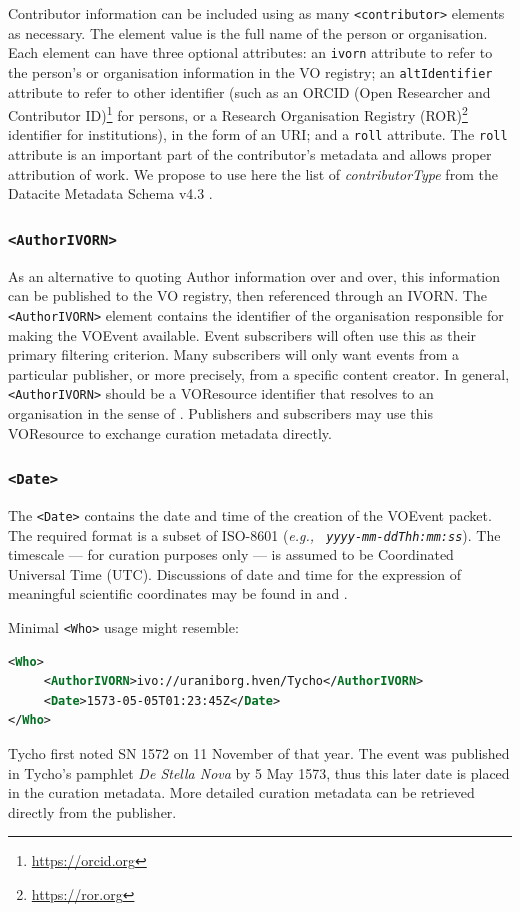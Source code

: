 \documentclass[11pt,a4paper]{ivoa}
\begin{document}
Contributor information can be included using as many {\tt <contributor>} 
elements as necessary. The element value is the full name of the person or 
organisation. Each element can have three optional attributes: an {\tt ivorn} 
attribute to refer to the person's or organisation information in the VO 
registry; an {\tt altIdentifier} attribute to refer to other identifier (such 
as an ORCID (Open Researcher and Contributor ID)\footnote{
\url{https://orcid.org}} for persons, or a Research Organisation Registry 
(ROR)\footnote{\url{https://ror.org}} identifier for institutions), in the form 
of an URI; and a {\tt roll} attribute. The {\tt roll} attribute is an important 
part of the contributor's metadata and allows proper attribution of work. We 
propose to use here the list of \emph{contributorType} from the Datacite 
Metadata Schema v4.3 \citep{https://doi.org/10.14454/7xq3-zf69}.

\subsubsection{\tt <AuthorIVORN>}
As an alternative to quoting Author information over and over, this information 
can be published to the VO registry, then referenced through an IVORN. The {\tt 
<AuthorIVORN>} element contains the identifier of the organisation responsible 
for making the VOEvent available. Event subscribers will often use this as their 
primary filtering criterion. Many subscribers will only want events from a 
particular publisher, or more precisely, from a specific content creator. In 
general, {\tt <AuthorIVORN>} should be a VOResource identifier that resolves to 
an organisation in the sense of \citep{2007ivoa.spec.0302H}. Publishers and 
subscribers may use this VOResource to exchange curation metadata directly. 

\subsubsection{\tt <Date>}
The {\tt <Date>} contains the date and time of the creation of the VOEvent 
packet. The required format is a subset of ISO-8601 (\emph{e.g., {\tt 
yyyy-mm-ddThh:mm:ss}}). The timescale --- for curation purposes only --- is 
assumed to be Coordinated Universal Time (UTC). Discussions of date and time for 
the expression of meaningful scientific coordinates may be found in 
\citep{2007ivoa.spec.1030R} and \citep{bib26}. 


Minimal {\tt <Who>} usage might resemble: 
\begin{lstlisting}[language=XML]
<Who>
     <AuthorIVORN>ivo://uraniborg.hven/Tycho</AuthorIVORN>
     <Date>1573-05-05T01:23:45Z</Date>
</Who> 
\end{lstlisting}
Tycho first noted SN 1572 on 11 November of that year. The event was published 
in Tycho's pamphlet \emph{De Stella Nova} by 5 May 1573, thus this later date is 
placed in the curation metadata. More detailed curation metadata can be 
retrieved directly from the publisher. 
\end{document}
